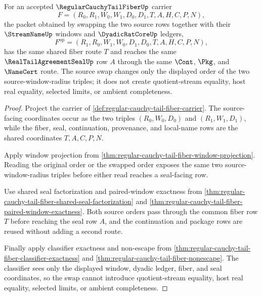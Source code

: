 \begin{theorem}
\label{thm:regular-cauchy-tail-fiber-source-swap-stability}
For an accepted $\RegularCauchyTailFiberUp$ carrier
$$
F=(R_0,R_1,W_0,W_1,D_0,D_1,T,A,H,C,P,N),
$$
the packet obtained by swapping the two source rows together with their $\StreamNameUp$ windows and $\DyadicRatCoreUp$ ledgers,
$$
F^{\mathrm{op}}=(R_1,R_0,W_1,W_0,D_1,D_0,T,A,H,C,P,N),
$$
has the same shared fiber route $T$ and reaches the same $\RealTailAgreementSealUp$ row $A$ through the same $\Cont$, $\Pkg$, and $\NameCert$ route. The source swap changes only the displayed order of the two source-window-radius triples; it does not create quotient-stream equality, host real equality, selected limits, or ambient completeness.
\end{theorem}
\begin{proof}
Project the carrier of \autoref{def:regular-cauchy-tail-fiber-carrier}. The source-facing coordinates occur as the two triples $(R_0,W_0,D_0)$ and $(R_1,W_1,D_1)$, while the fiber, seal, continuation, provenance, and local-name rows are the shared coordinates $T,A,C,P,N$.

Apply window projection from \autoref{thm:regular-cauchy-tail-fiber-window-projection}. Reading the original order or the swapped order exposes the same two source-window-radius triples before either read reaches a seal-facing row.

Use shared seal factorization and paired-window exactness from \autoref{thm:regular-cauchy-tail-fiber-shared-seal-factorization} and \autoref{thm:regular-cauchy-tail-fiber-paired-window-exactness}. Both source orders pass through the common fiber row $T$ before reaching the seal row $A$, and the continuation and package rows are reused without adding a second route.

Finally apply classifier exactness and non-escape from \autoref{thm:regular-cauchy-tail-fiber-classifier-exactness} and \autoref{thm:regular-cauchy-tail-fiber-nonescape}. The classifier sees only the displayed window, dyadic ledger, fiber, and seal coordinates, so the swap cannot introduce quotient-stream equality, host real equality, selected limits, or ambient completeness.
\end{proof}

